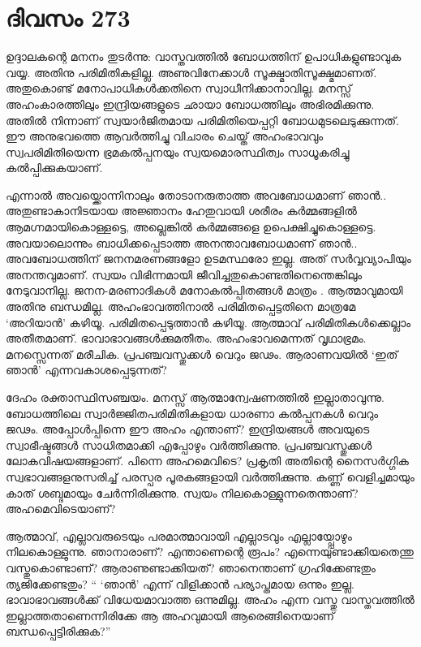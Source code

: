 \section{ദിവസം 273}


ഉദ്ദാലകന്റെ മനനം തുടര്‍ന്നു: വാസ്തവത്തില്‍ ബോധത്തിന് ഉപാധികളുണ്ടാവുക വയ്യ. അതിനു പരിമിതികളില്ല. അണുവിനേക്കാള്‍ സൂക്ഷ്മാതിസൂക്ഷ്മമാണത്. അതുകൊണ്ട് മനോപാധികള്‍ക്കതിനെ സ്വാധീനിക്കാനാവില്ല. മനസ്സ് അഹംകാരത്തിലും ഇന്ദ്രിയങ്ങളുടെ ഛായാ ബോധത്തിലും അഭിരമിക്കുന്നു. അതില്‍ നിന്നാണ് സ്വയാര്‍ജിതമായ  പരിമിതിയെപ്പറ്റി ബോധമുടലെടുക്കുന്നത്. ഈ അനുഭവത്തെ ആവര്‍ത്തിച്ചു വിചാരം ചെയ്ത് അഹംഭാവവും സ്വപരിമിതിയെന്ന ഭ്രമകല്‍പ്പനയും   സ്വയമൊരസ്ഥിത്വം സാധൂകരിച്ചു കല്‍പ്പിക്കുകയാണ്.

എന്നാല്‍ അവയ്ക്കൊന്നിനാലും തോടാനരുതാത്ത അവബോധമാണ് ഞാന്‍.. അതുണ്ടാകാനിടയായ അജ്ഞാനം ഹേതുവായി ശരീരം കര്‍മ്മങ്ങളില്‍ ആമഗ്നമായികൊള്ളട്ടെ, അല്ലെങ്കില്‍ കര്‍മ്മങ്ങളെ ഉപെക്ഷിച്ചുകൊള്ളട്ടെ. അവയാലൊന്നും ബാധിക്കപ്പെടാത്ത അനന്താവബോധമാണ് ഞാന്‍.. അവബോധത്തിന് ജനനമരണങ്ങളോ ഉടമസ്ഥരോ ഇല്ല. അത് സര്‍വ്വവ്യാപിയും അനന്തവുമാണ്. സ്വയം വിഭിന്നമായി ജീവിച്ചതുകൊണ്ടതിനെന്തെങ്കിലും നേടുവാനില്ല. ജനന-മരണാദികള്‍ മനോകല്‍പ്പിതങ്ങള്‍ മാത്രം . ആത്മാവുമായി അതിനു ബന്ധമില്ല. അഹംഭാവത്തിനാല്‍ പരിമിതപ്പെട്ടതിനെ മാത്രമേ ‘അറിയാന്‍’ കഴിയൂ. പരിമിതപ്പെടുത്താന്‍ കഴിയൂ. ആത്മാവ് പരിമിതികള്‍ക്കെല്ലാം അതീതമാണ്. ഭാവാഭാവങ്ങള്‍ക്കുമതീതം. അഹംഭാവമെന്നത് വൃഥാഭ്രമം. മനസ്സെന്നത് മരീചിക. പ്രപഞ്ചവസ്തുക്കള്‍ വെറും ജഢം. ആരാണവയില്‍ ‘ഇത് ഞാന്‍’ എന്നവകാശപ്പെടുന്നത്?

ദേഹം രക്താസ്ഥിസഞ്ചയം. മനസ്സ് ആത്മാന്വേഷണത്തില്‍ ഇല്ലാതാവുന്നു. ബോധത്തിലെ സ്വാര്‍ജ്ജിതപരിമിതികളായ ധാരണാ കല്‍പ്പനകള്‍ വെറും ജഢം. അപ്പോള്‍പ്പിന്നെ ഈ അഹം എന്താണ്? ഇന്ദ്രിയങ്ങള്‍ അവയുടെ സ്വാഭീഷ്ടങ്ങള്‍ സാധിതമാക്കി എപ്പോഴും വര്‍ത്തിക്കുന്നു. പ്രപഞ്ചവസ്തുക്കള്‍ ലോകവിഷയങ്ങളാണ്. പിന്നെ അഹമെവിടെ?
പ്രകൃതി അതിന്റെ നൈസര്‍ഗ്ഗിക സ്വഭാവങ്ങളനുസരിച്ച് പരസ്പര പൂരകങ്ങളായി വര്‍ത്തിക്കുന്നു. കണ്ണ് വെളിച്ചമായും കാത് ശബ്ദമായും ചേര്‍ന്നിരിക്കുന്നു. സ്വയം നിലകൊള്ളുന്നതെന്താണ്? അഹമെവിടെയാണ്?

ആത്മാവ്, എല്ലാവരുടെയും പരമാത്മാവായി എല്ലാടവും എല്ലായ്പ്പോഴും നിലകൊള്ളുന്നു. ഞാനാരാണ്? എന്താണെന്റെ രൂപം? എന്നെയുണ്ടാക്കിയതെന്തു വസ്തുകൊണ്ടാണ്? ആരാണുണ്ടാക്കിയത്? ഞാനെന്താണ് ഗ്രഹിക്കേണ്ടതും ത്യജിക്കേണ്ടതും? “ ‘ഞാന്‍’ എന്ന് വിളിക്കാന്‍ പര്യാപ്തമായ ഒന്നും ഇല്ല. ഭാവാഭാവങ്ങള്‍ക്ക് വിധേയമാവാത്ത ഒന്നുമില്ല.  അഹം എന്ന വസ്തു വാസ്തവത്തില്‍ ഇല്ലാത്തതാണെന്നിരിക്കേ ആ അഹവുമായി ആരെങ്ങിനെയാണ് ബന്ധപ്പെട്ടിരിക്കുക?”

